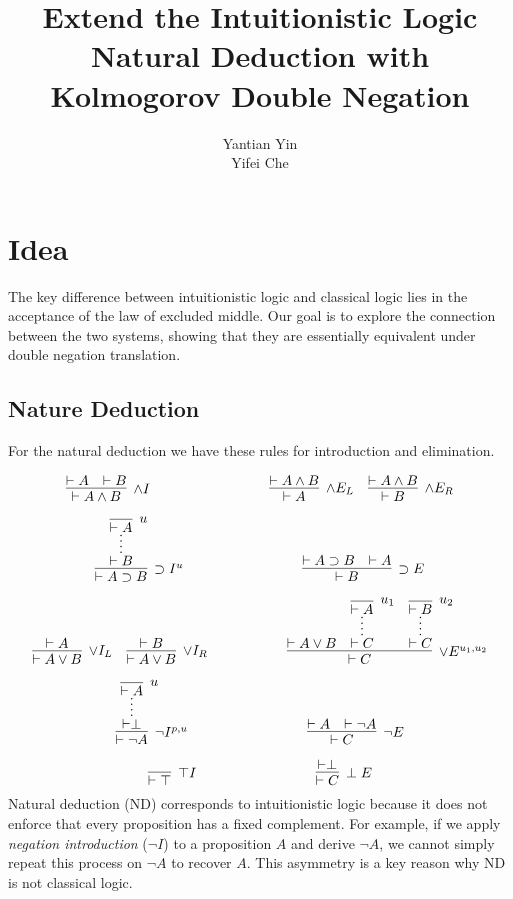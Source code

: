 \documentclass{article}
\title{Extend the Intuitionistic Logic Natural Deduction with Kolmogorov Double Negation}
\author{Yantian Yin \\ Yifei Che}
\date{}
\begin{document}
\maketitle

\section{Idea}

The key difference between intuitionistic logic and classical logic lies in the acceptance of the law of excluded middle. Our goal is to explore the connection between the two systems, showing that they are essentially equivalent under double negation translation.


\subsection{Nature Deduction}
For the natural deduction we have these rules for
 introduction and elimination.

\[
\infer[\land I]{\vdash A \land B}{\vdash A & \vdash B}
\hspace{3cm}
\infer[\land E_L]{\vdash A}{\vdash A \land B}
\quad
\infer[\land E_R]{\vdash B}{\vdash A \land B}
\]


\[
\infer[\supset I^u]{\vdash A \supset B}{
  \infer*{\vdash B}{\infer [u]{\vdash A}{}}
}
\hspace{3cm}
\infer[\supset E]{\vdash B}{\vdash A \supset B & \vdash A}
\]



\[
\infer[\lor I_L]{\vdash A \lor B}{\vdash A}
\quad
\infer[\lor I_R]{\vdash A \lor B}{\vdash B}
\hspace{2cm}
\infer[\lor E^{u_1, u_2}]{\vdash C}{
  \vdash A \lor B
  \quad
  \infer*{\vdash C}{\infer[u_1]{\vdash A}{}}
  \quad
  \infer*{\vdash C}{\infer[u_2]{\vdash B}{}}
}
\]

\[
\infer[\neg I^{p,u}]{\vdash \neg A}{
  \infer*{\vdash \perp}{\infer[u]{\vdash A}{}}
}
\hspace{3cm}
\infer[\neg E]{\vdash C}{
  \vdash A & \vdash \neg A
}
\]

\[
\infer[\top I]{\vdash \top}{}
\hspace{3cm}
\infer[\perp E]{\vdash C}{\vdash \perp}
\]
Natural deduction (ND) corresponds to intuitionistic logic because it does not enforce that every proposition has a fixed complement. For example, if we apply \emph{negation introduction} ($\neg I$) to a proposition $A$ and derive $\neg A$, we cannot simply repeat this process on $\neg A$ to recover $A$. This asymmetry is a key reason why ND is not classical logic.
\end{document}
